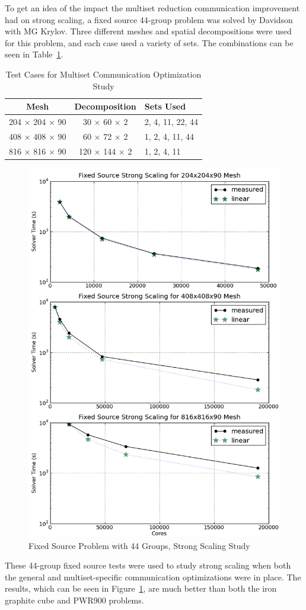 To get an idea of the impact the multiset reduction communication improvement had on strong scaling, a fixed source 44-group problem was solved by Davidson with MG Krylov. Three different meshes and spatial decompositions were used for this problem, and each case used a variety of sets. The combinations can be seen in Table~\ref{table:MultisetCommOpt}.
%
\begin{table}[!h]
\caption{Test Cases for Multiset Communication Optimization Study}
\begin{center}
\begin{tabular}{| c | c | l |}
\hline
Mesh & Decomposition & Sets Used \\[0.5ex]
\hline
204 $\times$ 204 $\times$ 90 & 30 $\times$  60 $\times$  2 & 2, 4, 11, 22, 44 \\
408 $\times$ 408 $\times$ 90 & 60 $\times$  72 $\times$  2 & 1, 2, 4, 11, 44 \\
816 $\times$ 816 $\times$ 90 & 120 $\times$  144 $\times$  2 & 1, 2, 4, 11 \\
\hline
\end{tabular}
\end{center}
\label{table:MultisetCommOpt}
\end{table}
%
\begin{figure}[!h]
  \begin{center}
    \includegraphics [width=.78\textwidth, height=0.9\textheight ] {FxdSrcKrylovStrongScaling}
  \end{center}
  \caption{Fixed Source Problem with 44 Groups, Strong Scaling Study}
  \label{fig:FxdStrong}
\end{figure}
%
These 44-group fixed source tests were used to study strong scaling when both the general and multiset-specific communication optimizations were in place. The results, which can be seen in Figure~\ref{fig:FxdStrong}, are much better than both the iron graphite cube and PWR900 problems. 


